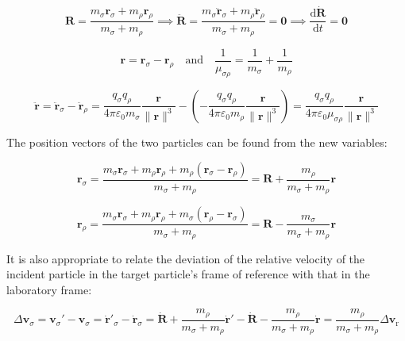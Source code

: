 \begin{equation}
    \mathbf{R}=\frac{m_\sigma\mathbf{r}_\sigma+m_\rho\mathbf{r}_\rho}{m_\sigma+m_\rho}\implies\ddot{\mathbf{R}}=\frac{m_\sigma\ddot{\mathbf{r}}_\sigma+m_\rho\ddot{\mathbf{r}}_\rho}{m_\sigma+m_\rho}=\mathbf{0}\implies\frac{\mathrm{d}\dot{\mathbf{R}}}{\mathrm{d}t}=\mathbf{0}
\end{equation}

\begin{equation}
    \mathbf{r}=\mathbf{r}_\sigma -\mathbf{r}_\rho \quad\text{and}\quad\frac{1}{\mu_{\sigma\rho}}=\frac{1}{m_\sigma }+\frac{1}{m_\rho }
\end{equation}

\begin{equation}
    \ddot{\mathbf{r}}=\ddot{\mathbf{r}}_\sigma-\ddot{\mathbf{r}}_\rho=\frac{q_\sigma q_\rho }{4\pi\varepsilon_0 m_\sigma }\frac{\mathbf{r}}{\|\mathbf{r}\|^3}-\left(-\frac{q_\sigma q_\rho }{4\pi\varepsilon_0 m_\rho }\frac{\mathbf{r}}{\|\mathbf{r}\|^3}\right)=\frac{q_\sigma q_\rho }{4\pi\varepsilon_0\mu_{\sigma\rho}}\frac{\mathbf{r}}{\|\mathbf{r}\|^3}
\end{equation}

The position vectors of the two particles can be found from the new variables:

\begin{equation}
    \label{eq-fokker-5}
    \mathbf{r}_\sigma =\frac{m_\sigma \mathbf{r}_\sigma +m_\rho \mathbf{r}_\rho +m_\rho (\mathbf{r}_\sigma -\mathbf{r}_\rho )}{m_\sigma +m_\rho }=\mathbf{R}+\frac{m_\rho }{m_\sigma +m_\rho }\mathbf{r}
\end{equation}

\begin{equation}
    \label{eq-fokker-6}
    \mathbf{r}_\rho =\frac{m_\sigma \mathbf{r}_\sigma +m_\rho \mathbf{r}_\rho +m_\sigma (\mathbf{r}_\rho -\mathbf{r}_\sigma )}{m_\sigma +m_\rho }=\mathbf{R}-\frac{m_\sigma }{m_\sigma +m_\rho }\mathbf{r}
\end{equation}

It is also appropriate to relate the deviation of the relative velocity of the incident particle in the target particle's frame of reference with that in the laboratory frame:

\begin{equation}
    \label{eq-fokker-7}
    \Delta\mathbf{v}_\sigma=\mathbf{v}_\sigma'-\mathbf{v}_\sigma=\dot{\mathbf{r}}'_\sigma-\dot{\mathbf{r}}_\sigma=\dot{\mathbf{R}}+\frac{m_\rho}{m_\sigma+m_\rho}\dot{\mathbf{r}}'-\dot{\mathbf{R}}-\frac{m_\rho}{m_\sigma+m_\rho}\dot{\mathbf{r}}=\frac{m_\rho}{m_\sigma+m_\rho}\Delta\mathbf{v}_\text{r}
\end{equation}

